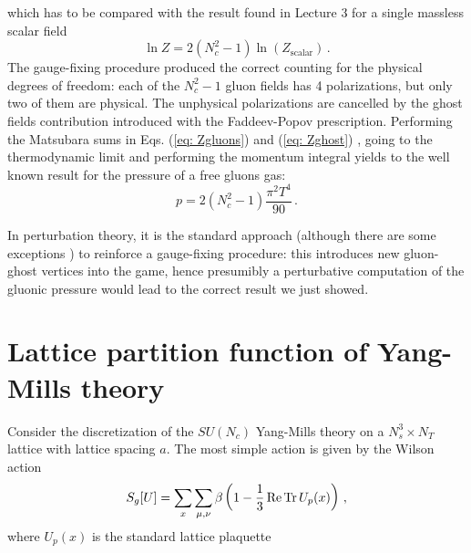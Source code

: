 \documentclass{article}
\begin{document}
which has to be compared with the result found in Lecture 3 for a single massless scalar field
\begin{equation}
    \ln Z = 2(N_c^2 - 1) \ln(Z_{\textrm{scalar}}) \, .
\end{equation}
The gauge-fixing procedure produced the correct counting for the physical degrees of freedom: each of the $N_c^2 - 1$ gluon fields has 4 polarizations, but only two of them are physical. The unphysical polarizations 
are cancelled by the ghost fields contribution introduced with the Faddeev-Popov prescription.
Performing the Matsubara sums in Eqs. (\ref{eq: Zgluons}) and (\ref{eq: Zghost}) \cite{Philipsen:2010gj}, going to the thermodynamic limit and performing the momentum integral 
yields to the well known result for the pressure of a free gluons gas:
\begin{equation}
    p = 2(N_c^2 - 1) \frac{\pi^2 T^4}{90} \, .
\end{equation}

In perturbation theory, it is the standard approach (although there are some exceptions \cite{Parisi:1980ys}) to reinforce a gauge-fixing procedure: this introduces new gluon-ghost vertices
into the game, hence presumibly a perturbative computation of the gluonic pressure would lead to the correct result we just showed.






\section{Lattice partition function of Yang-Mills theory}

Consider the discretization of the $SU(N_c)$ Yang-Mills theory on a $N_s^3 \times N_T$ lattice with lattice spacing $a$. The most simple action is given by the Wilson action
\begin{equation}\label{eq: Wilson_S}
    S_g[U] = \sum_x \sum_{\mu, \nu} \beta \left( 1 - \frac{1}{3} \Re \Tr U_p(x)  \right) \, ,
\end{equation}
where $U_p(x)$ is the standard lattice plaquette
\end{document}
